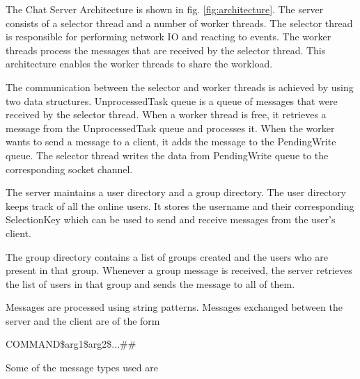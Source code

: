 \documentclass{article}
\begin{document}
The Chat Server Architecture is shown in fig. \ref{fig:architecture}. The server consists of a selector thread and a number of worker threads.
The selector thread is responsible for performing network IO and reacting to events. The worker threads process the messages that are received by the selector thread.
This architecture enables the worker threads to share the workload.

The communication between the selector and worker threads is achieved by using two data structures. UnprocessedTask queue is a queue of messages that were received by the selector thread. 
When a worker thread is free, it retrieves a message from the UnprocessedTask queue and processes it.
When the worker wants to send a message to a client, it adds the message to the PendingWrite queue. 
The selector thread writes the data from PendingWrite queue to the corresponding socket channel.

The server maintains a user directory and a group directory. 
The user directory keeps track of all the online users. 
It stores the username and their corresponding SelectionKey which can be used to send and receive messages from the user's client.

The group directory contains a list of groups created and the users who are present in that group. Whenever a group message is received, the server retrieves the list of users in that group and sends the message to all of them.

Messages are processed using string patterns.
Messages exchanged between the server and the client are of the form

COMMAND\$arg1\$arg2\$...\#\#

Some of the message types used are
\end{document}

